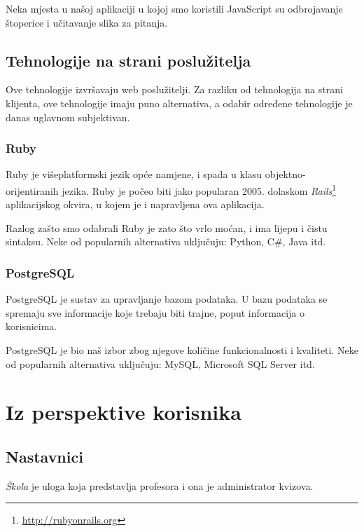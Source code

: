 \documentclass{scrreprt}
\begin{document}
Neka mjesta u našoj aplikaciji u kojoj smo koristili JavaScript su odbrojavanje
štoperice i učitavanje slika za pitanja.

\subsection{Tehnologije na strani poslužitelja}

Ove tehnologije izvršavaju web poslužitelji. Za razliku od tehnologija na
strani klijenta, ove tehnologije imaju puno alternativa, a odabir određene
tehnologije je danas uglavnom subjektivan.

\subsubsection{Ruby}

Ruby je višeplatformski jezik opće namjene, i spada u klasu
objektno-orijentiranih jezika. Ruby je počeo biti jako popularan 2005. dolaskom
\textit{Rails}\footnote{\url{http://rubyonrails.org}} aplikacijskog okvira, u
kojem je i napravljena ova aplikacija.

Razlog zašto smo odabrali Ruby je zato što vrlo moćan, i ima lijepu i čistu
sintaksu. Neke od popularnih alternativa uključuju: Python, C\#, Java itd.

\subsubsection{PostgreSQL}

PostgreSQL je sustav za upravljanje bazom podataka. U bazu podataka se spremaju
sve informacije koje trebaju biti trajne, poput informacija o korisnicima.

PostgreSQL je bio naš izbor zbog njegove količine funkcionalnosti i kvaliteti.
Neke od popularnih alternativa uključuju: MySQL, Microsoft SQL Server itd.

\section{Iz perspektive korisnika}

\subsection{Nastavnici}

\emph{Škola} je uloga koja predstavlja profesora i ona je administrator kvizova.

\end{document}
